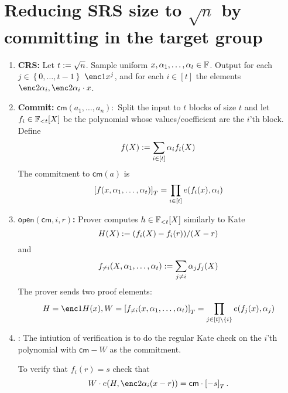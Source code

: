 \documentclass[11pt]{article}
\numberwithin{figure}{section} %
\newcommand{\cm}{\ensuremath{\mathsf{cm}}\xspace}
\newcommand{\open}{\ensuremath{\mathsf{open}}\xspace}
\newcommand{\set}[1]{\ensuremath{\left\{#1\right\}}\xspace}
\begin{document}
  \section{Reducing SRS size to $\sqrt{n}$ by committing in the target group}
 \begin{enumerate}
  \item \textbf{CRS:} Let $t:= \sqrt n$. Sample uniform $x,\alpha_1,\ldots,\alpha_t\in {\mathbb F}$. Output for each  $j\in \set{0,\ldots, t-1}$ $\enc1{x^j}$, and for each $i\in [t]$ the elements $\enc2{\alpha_i},\enc2{\alpha_i\cdot x}$.
  \item \textbf{Commit:} $\cm(a_1,\ldots,a_n):$ Split the input to $t$ blocks of size $t$ and let $f_i\in{\mathbb F}_{< t}[X]$ be the polynomial whose values/coefficient are the $i$'th block.
  Define
  \[f(X):= \sum_{i\in [t]} \alpha_i f_i(X)  \]
  The commitment  to $\cm(a)$ is 
  \[\left[f(x,\alpha_1,\ldots,\alpha_t)\right]_T = \prod_{i\in [t]} e(f_i(x),\alpha_i)\]
  \item \textbf{$\open(\cm,i,r)$:}  Prover computes $h\in {\mathbb F}_{< t}[X]$ similarly to Kate
  \[H(X):= (f_i(X)-f_i(r))/(X-r)\]
  and 
  \[f_{\neq i}(X,\alpha_1,\ldots,\alpha_t):=\sum_{j\neq i} \alpha_j f_j(X)\]
  The prover sends two proof elements:
  \[H=\enc1{H(x)},W=\enct{f_{\neq i}(x,\alpha_1,\ldots,\alpha_t)}=\prod_{j\in [t]\setminus\set{i}} e(f_j(x),\alpha_j)\] 
  \item \verify{\cm,H,W,i,r,s}: The intiution of verification is to do the regular Kate check on the $i$'th polynomial with $\cm-W$ as the commitment.
  
  To verify that $f_i(r)=s$  check that
  \[W\cdot e(H,\enc2{\alpha_i(x-r)})= \cm \cdot \enct{-s}.\]
  \end{enumerate}

  
  
 

\end{document}
